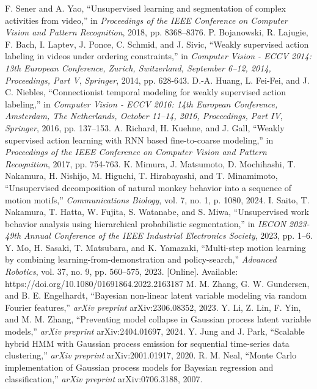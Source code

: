\documentclass[conference]{IEEEtran}
\begin{document}
\begin{thebibliography}{00}
 F. Sener and A. Yao, “Unsupervised learning and segmentation of complex activities from video,” in \textit{Proceedings of the IEEE Conference on Computer Vision and Pattern Recognition}, 2018, pp. 8368--8376.
 P. Bojanowski, R. Lajugie, F. Bach, I. Laptev, J. Ponce, C. Schmid, and J. Sivic, “Weakly supervised action labeling in videos under ordering constraints,” in \textit{Computer Vision - ECCV 2014: 13th European Conference, Zurich, Switzerland, September 6--12, 2014, Proceedings, Part V}, \textit{Springer}, 2014, pp. 628-643.
 D.-A. Huang, L. Fei-Fei, and J. C. Niebles, “Connectionist temporal modeling for weakly supervised action labeling,” in \textit{Computer Vision - ECCV 2016: 14th European Conference, Amsterdam, The Netherlands, October 11--14, 2016, Proceedings, Part IV}, \textit{Springer}, 2016, pp. 137--153.
 A. Richard, H. Kuehne, and J. Gall, “Weakly supervised action learning with RNN based fine-to-coarse modeling,” in \textit{Proceedings of the IEEE Conference on Computer Vision and Pattern Recognition}, 2017, pp. 754-763.
 K. Mimura, J. Matsumoto, D. Mochihashi, T. Nakamura, H. Nishijo, M. Higuchi, T. Hirabayashi, and T. Minamimoto, “Unsupervised decomposition of natural monkey behavior into a sequence of motion motifs,” \textit{Communications Biology}, vol. 7, no. 1, p. 1080, 2024.
 I. Saito, T. Nakamura, T. Hatta, W. Fujita, S. Watanabe, and S. Miwa, “Unsupervised work behavior analysis using hierarchical probabilistic segmentation,” in \textit{IECON 2023-49th Annual Conference of the IEEE Industrial Electronics Society}, 2023, pp. 1--6.
 Y. Mo, H. Sasaki, T. Matsubara, and K. Yamazaki, “Multi-step motion learning by combining learning-from-demonstration and policy-search,” \textit{Advanced Robotics}, vol. 37, no. 9, pp. 560--575, 2023. [Online]. Available: https://doi.org/10.1080/01691864.2022.2163187
 M. M. Zhang, G. W. Gundersen, and B. E. Engelhardt, “Bayesian non-linear latent variable modeling via random Fourier features,” \textit{arXiv preprint} arXiv:2306.08352, 2023.
 Y. Li, Z. Lin, F. Yin, and M. M. Zhang, “Preventing model collapse in Gaussian process latent variable models,” \textit{arXiv preprint} arXiv:2404.01697, 2024.
 Y. Jung and J. Park, “Scalable hybrid HMM with Gaussian process emission for sequential time-series data clustering,” \textit{arXiv preprint} arXiv:2001.01917, 2020.
R. M. Neal, “Monte Carlo implementation of Gaussian process models for Bayesian regression and classification,” \textit{arXiv preprint} arXiv:0706.3188, 2007.
\end{thebibliography}

\vspace{12pt}
\end{document}
